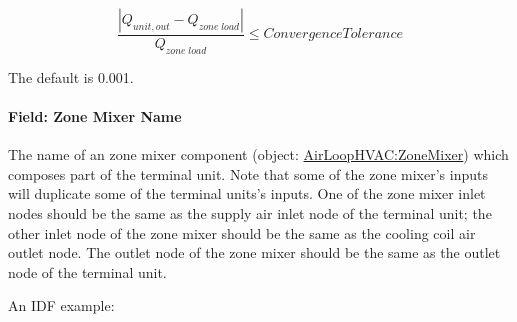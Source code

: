 \begin{equation}
\frac{{\left| {{Q_{unit,out}} - {Q_{zone\;load}}} \right|}}{{{Q_{zone\;load}}}} \le ConvergenceTolerance
\end{equation}

The default is 0.001.

\paragraph{Field: Zone Mixer Name}\label{field-zone-mixer-name-2}

The name of an zone mixer component (object: \hyperref[airloophvaczonemixer]{AirLoopHVAC:ZoneMixer}) which composes part of the terminal unit. Note that some of the zone mixer's inputs will duplicate some of the terminal units's inputs. One of the zone mixer inlet nodes should be the same as the supply air inlet node of the terminal unit; the other inlet node of the zone mixer should be the same as the cooling coil air outlet node. The outlet node of the zone mixer should be the same as the outlet node of the terminal unit.

An IDF example:

